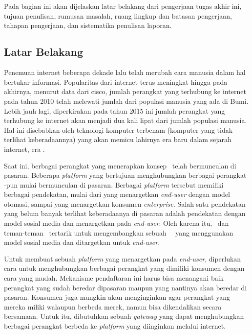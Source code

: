 \chapter{\babSatu}
Pada bagian ini akan dijelaskan latar belakang dari pengerjaan tugas akhir ini, tujuan penulisan, rumusan masalah, ruang lingkup dan batasan pengerjaan, tahapan pengerjaan, dan sistematika penulisan laporan.


\section{Latar Belakang}
Penemuan internet beberapa dekade lalu telah merubah cara manusia dalam hal bertukar informasi. Popularitas dari internet terus meningkat hingga pada akhirnya, menurut data dari cisco\cite{CiscoIot}, jumlah perangkat yang terhubung ke internet pada tahun 2010 telah melewati jumlah dari populasi manusia yang ada di Bumi. Lebih jauh lagi, diperkirakan pada tahun 2015 ini jumlah perangkat yang terhubung ke internet akan menjadi dua kali lipat dari jumlah populasi manusia. Hal ini disebabkan oleh teknologi komputer terbenam (komputer yang tidak terlihat keberadaannya) yang akan memicu lahirnya era baru dalam sejarah internet, era \iot.

Saat ini, berbagai perangkat yang menerapkan konsep \iot~telah bermunculan di pasaran. Beberapa \textit{platform} yang bertujuan menghubungkan berbagai perangkat \iot-pun mulai bermunculan di pasaran. Berbagai \textit{platform} tersebut memiliki berbagai pendekatan, mulai dari yang menargetkan \textit{end-user} dengan model otomasi, sampai yang menargetkan konsumen \textit{enterprise}. Salah satu pendekatan yang belum banyak terlihat keberadaanya di pasaran adalah pendekatan dengan model sosial media dan menargetkan pada \textit{end-user}. Oleh karena itu, \saya~dan teman-teman \saya~tertarik untuk mengembangkan sebuah \plat~\iot~yang menggunakan model sosial media dan ditargetkan untuk \textit{end-user}.

Untuk membuat sebuah \textit{platform} yang menargetkan pada \textit{end-user}, diperlukan cara untuk menghubungkan berbagai perangkat yang dimiliki konsumen dengan cara yang mudah. Mekanisme pendaftaran ini harus bisa menangani baik perangkat yang sudah beredar dipasaran maupun yang nantinya akan beredar di pasaran. Konsumen juga mungkin akan menginginkan agar perangkat yang mereka miliki walaupun berbeda merek, namun bisa dikendalikan secara bersamaan. Untuk itu, dibutuhkan sebuah \textit{gateway} yang dapat menghubungkan berbagai perangkat berbeda ke \textit{platform} yang diinginkan melalui internet.

